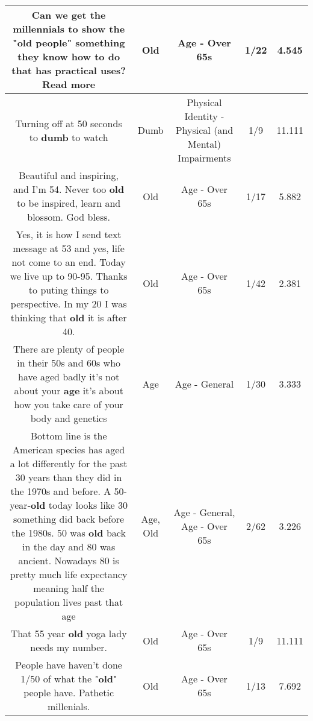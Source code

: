\documentclass[11pt]{article}
\newlength\mylength
\begin{document}
\begin{center}
\begin{longtable}{|C{.65\mylength}|C{.30\mylength}|C{.12\mylength}|C{.12\mylength}|C{.12\mylength}|}
  \small Can we get the millennials to show the "\textbf{old} people" something they know how to do that has practical uses?Read more\normalsize   & Old & Age - Over 65s & 1/22 & 4.545 \\  \hline
  \small Turning off at 50 seconds to \textbf{dumb} to watch\normalsize   & Dumb & Physical Identity - Physical (and Mental) Impairments & 1/9 & 11.111 \\  \hline
  \small Beautiful and inspiring, and I'm 54. Never too \textbf{old} to be inspired, learn and blossom. God bless.\normalsize   & Old & Age - Over 65s & 1/17 & 5.882 \\  \hline
  \small Yes, it is how I send text message at 53 and yes, life not come to an end. Today we live up to 90-95. Thanks to puting things to perspective. In my 20 I was thinking that \textbf{old} it is after 40.\normalsize   & Old & Age - Over 65s & 1/42 & 2.381 \\  \hline
  \small There are plenty of people in their 50s and 60s who have aged badly it's not about your \textbf{age} it's about how you take care of your body and genetics\normalsize   & Age & Age - General & 1/30 & 3.333 \\  \hline
  \small Bottom line is the American species has aged a lot differently for the past 30 years than they did in the 1970s and before. A 50-year-\textbf{old} today looks like 30 something did back before the 1980s. 50 was \textbf{old} back in the day and 80 was ancient. Nowadays 80 is pretty much life expectancy meaning half the population lives past that age\normalsize   & Age, Old & Age - General, Age - Over 65s & 2/62 & 3.226 \\  \hline
  \small That 55 year \textbf{old} yoga lady needs my number.\normalsize   & Old & Age - Over 65s & 1/9 & 11.111 \\  \hline
  \small People have haven't done 1/50 of what the "\textbf{old}" people have.  Pathetic millenials.\normalsize   & Old & Age - Over 65s & 1/13 & 7.692 \\  \hline

\end{longtable}
\end{center}
\end{document}
